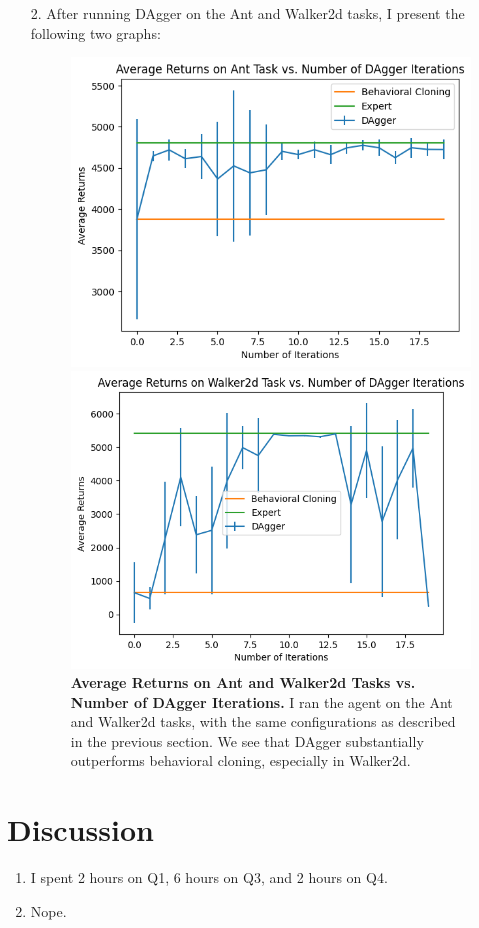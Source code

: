 \documentclass[12pt]{article}
\begin{document}
\begin{itemize}
  \item [2.] After running DAgger on the Ant and Walker2d tasks, I present the following two graphs:
  \begin{figure}[h!]
    \begin{center}
    \includegraphics[width=\textwidth*2/3]{ant_dagger.png}

    \includegraphics[width=\textwidth*2/3]{walker2d_dagger.png}
  \end{center}
  \caption{\textbf{Average Returns on Ant and Walker2d Tasks vs. Number of DAgger Iterations.} I ran the agent on the Ant and Walker2d tasks, with the same configurations as described in the previous section. We see that DAgger substantially outperforms behavioral cloning, especially in Walker2d.}
  \end{figure}
\end{itemize}

\section{Discussion}

\begin{enumerate}
  \item I spent 2 hours on Q1, 6 hours on Q3, and 2 hours on Q4.
  \item Nope.
\end{enumerate}
\end{document}
